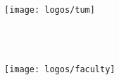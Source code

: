 \thispagestyle{empty}

\vspace{40mm}
\begin{center}
  \texttt{[image: logos/tum]}

  \vspace{5mm}
  {\huge\MakeUppercase{\getFaculty{}}}\\
  \vspace{5mm}
  {\large\MakeUppercase{\getUniversity{}}}\\
  \vspace{1mm}
\end{center}

\vspace{15mm}

\begin{center}
  {\Large \getDoctype{}}

  \vspace{20mm}

  {\huge\bfseries \getTitle{}}

  \vspace{15mm}

  {\LARGE \getAuthor{}}

  \vspace{20mm}

  \texttt{[image: logos/faculty]}
\end{center}

\cleardoublepage{}
